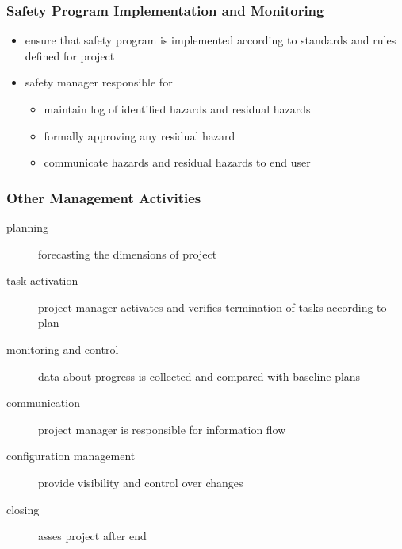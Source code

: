 \documentclass[a4paper, 10pt]{article}
\begin{document}
\subsubsection*{Safety Program Implementation and Monitoring}
\begin{itemize}
    \item ensure that safety program is implemented according to standards and rules defined for project
    \item safety manager responsible for
    \begin{itemize}
        \item maintain log of identified hazards and residual hazards
        \item formally approving any residual hazard
        \item communicate hazards and residual hazards to end user
    \end{itemize}
\end{itemize}

\subsubsection*{Other Management Activities}
\begin{description}
    \item[planning] forecasting the dimensions of project
    \item[task activation] project manager activates and verifies termination of tasks according to plan
    \item[monitoring and control] data about progress is collected and compared with baseline plans
    \item[communication] project manager is responsible for information flow
    \item[configuration management] provide visibility and control over changes
    \item[closing] asses project after end
\end{description}
\end{document}
